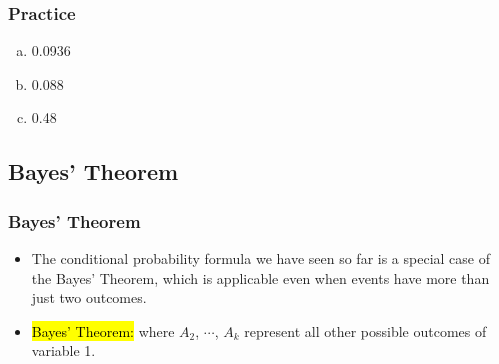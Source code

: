 
\begin{frame}
\frametitle{Practice}


{
\begin{enumerate}[(a)]
\item 0.0936
\item 0.088
\item 0.48
\end{enumerate}
}
{
}


\end{frame}


\subsection{Bayes' Theorem}


\begin{frame}
\frametitle{Bayes' Theorem}

\begin{itemize}

\item The conditional probability formula we have seen so far is a special case of the Bayes' Theorem, which is applicable even when events have more than just two outcomes.

\pause 

\item \hl{Bayes' Theorem:}
where $A_2$, $\cdots$, $A_k$ represent all other possible outcomes of variable 1.

\end{itemize}

\end{frame}

